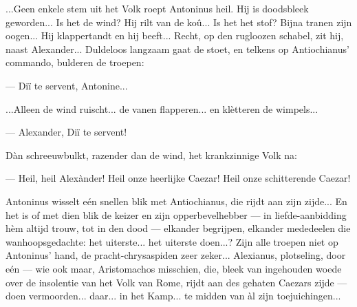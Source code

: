 \documentclass[a4paper, 12pt, oneside, dutch]{article}
\begin{document}
...Geen enkele stem uit het Volk roept Antoninus heil. Hij is doodsbleek geworden... Is het de wind? Hij rilt van de koû... Is het het stof? Bijna tranen zijn oogen... Hij klappertandt en hij beeft... Recht, op den rugloozen schabel, zit hij, naast Alexander... Duldeloos langzaam gaat de stoet, en telkens op Antiochianus' commando, bulderen de troepen:

--- Diï te servent, Antonine...

...Alleen de wind ruischt... de vanen flapperen... en klètteren de wimpels...

--- Alexander, Diï te servent!

Dàn schreeuwbulkt, razender dan de wind, het krankzinnige Volk na:

--- Heil, heil Alexànder! Heil onze heerlijke Caezar! Heil onze schitterende Caezar!

Antoninus wisselt eén snellen blik met Antiochianus, die rijdt aan zijn zijde... En het is of met dien blik de keizer en zijn opperbevelhebber --- in liefde-aanbidding hèm altijd trouw, tot in den dood --- elkander begrijpen, elkander mededeelen die wanhoopsgedachte: het uiterste... het uiterste doen...? Zijn alle troepen niet op Antoninus' hand, de pracht-chrysaspiden zeer zeker... Alexianus, plotseling, door eén --- wie ook maar, Aristomachos misschien, die, bleek van ingehouden woede over de insolentie van het Volk van Rome, rijdt aan des gehaten Caezars zijde --- doen vermoorden... daar... in het Kamp... te midden van àl zijn toejuichingen...
\end{document}
